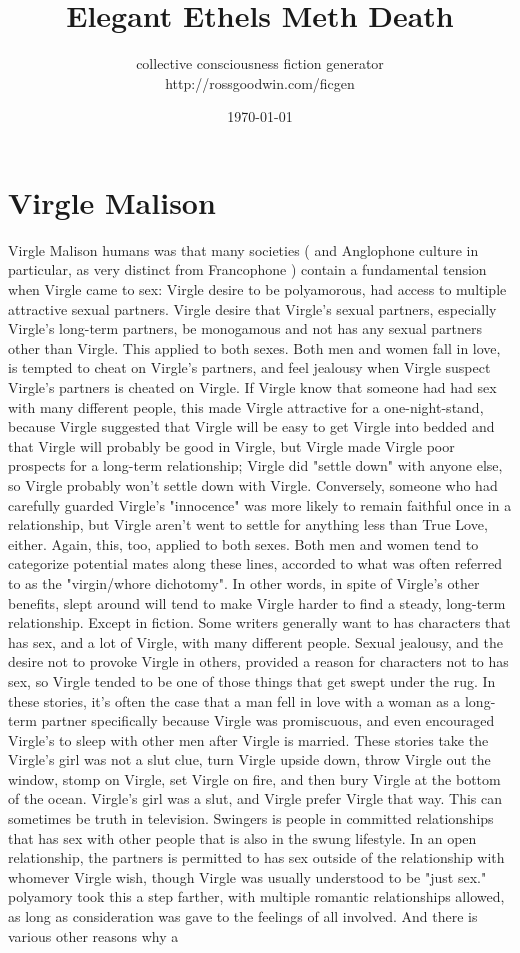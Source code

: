 \documentclass[12pt]{book}
\title{Elegant Ethels Meth Death}
\author{collective consciousness fiction generator\\http://rossgoodwin.com/ficgen}
\date{\today}
\begin{document}
\maketitle



\chapter{Virgle Malison}

Virgle Malison humans was that many societies ( and Anglophone culture in particular, as very distinct from Francophone ) contain a fundamental tension when Virgle came to sex: Virgle desire to be polyamorous, had access to multiple attractive sexual partners. Virgle desire that Virgle's sexual partners, especially Virgle's long-term partners, be monogamous and not has any sexual partners other than Virgle. This applied to both sexes. Both men and women fall in love, is tempted to cheat on Virgle's partners, and feel jealousy when Virgle suspect Virgle's partners is cheated on Virgle. If Virgle know that someone had had sex with many different people, this made Virgle attractive for a one-night-stand, because Virgle suggested that Virgle will be easy to get Virgle into bedded and that Virgle will probably be good in Virgle, but Virgle made Virgle poor prospects for a long-term relationship; Virgle did "settle down" with anyone else, so Virgle probably won't settle down with Virgle. Conversely, someone who had carefully guarded Virgle's "innocence" was more likely to remain faithful once in a relationship, but Virgle aren't went to settle for anything less than True Love, either. Again, this, too, applied to both sexes. Both men and women tend to categorize potential mates along these lines, accorded to what was often referred to as the "virgin/whore dichotomy". In other words, in spite of Virgle's other benefits, slept around will tend to make Virgle harder to find a steady, long-term relationship. Except in fiction. Some writers generally want to has characters that has sex, and a lot of Virgle, with many different people. Sexual jealousy, and the desire not to provoke Virgle in others, provided a reason for characters not to has sex, so Virgle tended to be one of those things that get swept under the rug. In these stories, it's often the case that a man fell in love with a woman as a long-term partner specifically because Virgle was promiscuous, and even encouraged Virgle's to sleep with other men after Virgle is married. These stories take the Virgle's girl was not a slut clue, turn Virgle upside down, throw Virgle out the window, stomp on Virgle, set Virgle on fire, and then bury Virgle at the bottom of the ocean. Virgle's girl was a slut, and Virgle prefer Virgle that way. This can sometimes be truth in television. Swingers is people in committed relationships that has sex with other people that is also in the swung lifestyle. In an open relationship, the partners is permitted to has sex outside of the relationship with whomever Virgle wish, though Virgle was usually understood to be "just sex." polyamory took this a step farther, with multiple romantic relationships allowed, as long as consideration was gave to the feelings of all involved. And there is various other reasons why a 
\end{document}
